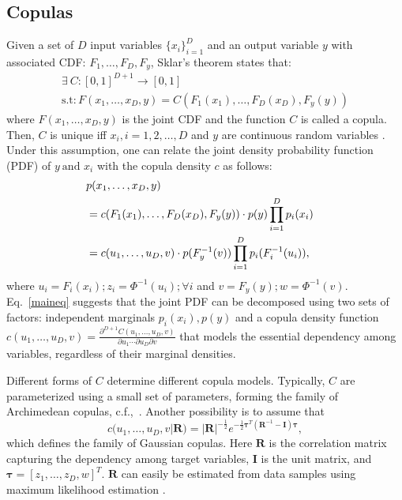 \documentclass{article}
\newcommand{\todo}[1]{\textcolor{red}{#1}}
\begin{document}
\subsection{Copulas}
	Given a set of $D$ input variables $\{x_i\}^D_{i=1}$ and an output variable $y$ with associated CDF: $F_{1},\ldots,F_{D}, F_{y}$, Sklar's theorem \cite{DBLP:journals/kybernetika/Sklar73} states that:
\begin{multline}  \exists  \ C: [0,1]^{D+1} \to [0,1]  \\
	\text{s.t} :  F(x_1,\ldots,x_D,y)=C(F_{1}(x_1) ,\ldots,F_{D}(x_D),F_{y}(y) )
\end{multline}
where $F(x_1,\ldots,x_D,y)$ is the joint CDF and the function $C$ is called a copula. Then, $C$ is unique iff $x_i,i=1,2,\ldots,D $ and $y$ are continuous random variables \cite{Nelsen:2006:IC:1204326}. Under this assumption, one can relate the joint density probability function (PDF) of $ y \  \text{and }x_i$ with the copula density $c$ as follows:
{\small \begin{align}  
	\lefteqn{p(x_1,\ldots,x_D,y)} \nonumber \\
    &= c(F_1(x_1) ,\ldots,F_D(x_D),F_y(y)) \cdot p(y) \prod_{i=1}^D p_{i}(x_i)  \label{maineq} \\
    &= c(u_1,\ldots,u_D,v) \cdot p(F^{-1}_y(v)) \prod_{i=1}^D p_{i}(F^{-1}_i(u_i)),
\end{align}}
where $u_i=F_i(x_i); z_i= \Phi^{-1}(u_i) ; \forall i$ and $v=F_y(y) ; w=\Phi^{-1}(v)$. Eq.~\ref{maineq} suggests that the joint PDF can be decomposed using two sets of factors:  independent marginals $p_{i}(x_i),p(y)$ and a copula density function $c(u_1,\ldots,u_D,v) = \frac{\partial^{D+1} C(u_1,\ldots,u_D,v)}{\partial u_1 \cdots \partial u_D \partial v}$ that models the essential dependency among variables, regardless of their marginal densities. 

Different forms of $C$ determine different copula models.  Typically, $C$ are parameterized using a small set of parameters, forming the family of Archimedean copulas, c.f.,~\cite{Nelsen:2006:IC:1204326}.  Another possibility is to assume that 
\begin{equation}\label{eq:gcop}
	c(u_1,\ldots,u_D,v |\boldsymbol{R}   )= | \boldsymbol{R} |^{-\frac{1}{2}} e^{-\frac{1}{2}  \boldsymbol{\tau}^T ( \boldsymbol{R}^{-1}-\boldsymbol{I}) \boldsymbol{\tau} } ,
\end{equation}
which defines the family of Gaussian copulas. Here $\boldsymbol{R}$ %
is the correlation matrix capturing the dependency among target variables, $\boldsymbol{I}$ is the unit matrix, and $\boldsymbol{\tau}=[z_1,\ldots,z_D,w]^T$. $\boldsymbol{R}$ can easily be estimated from data samples using maximum likelihood estimation \cite{choros2010copula}.
\end{document}
